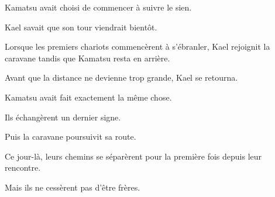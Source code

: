Kamatsu avait choisi de commencer à suivre le sien.

Kael savait que son tour viendrait bientôt.

Lorsque les premiers chariots commencèrent à s'ébranler, Kael rejoignit la
caravane tandis que Kamatsu resta en arrière.

Avant que la distance ne devienne trop grande, Kael se retourna.

Kamatsu avait fait exactement la même chose.

Ils échangèrent un dernier signe.

Puis la caravane poursuivit sa route.

Ce jour-là, leurs chemins se séparèrent pour la première fois depuis leur
rencontre.

Mais ils ne cessèrent pas d'être frères.